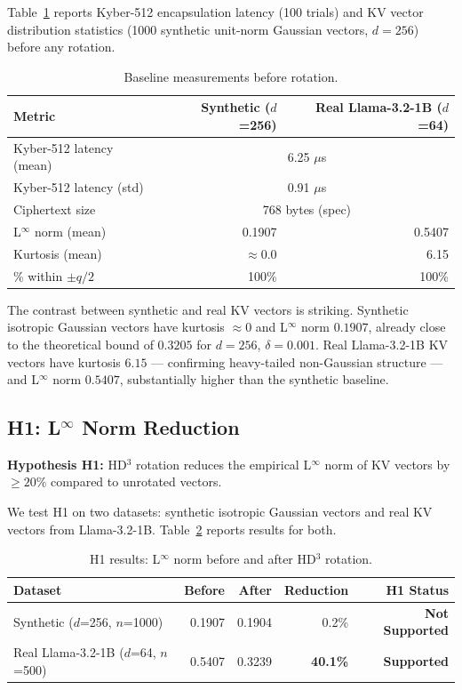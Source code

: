 \documentclass[preprint,a4paper]{article}
\begin{document}
Table~\ref{tab:baseline} reports Kyber-512
encapsulation latency (100 trials) and KV vector
distribution statistics (1000 synthetic unit-norm
Gaussian vectors, $d = 256$) before any rotation.

\begin{table}[h]
\centering
\caption{Baseline measurements before rotation.}
\label{tab:baseline}
\begin{tabular}{lrr}
\toprule
\textbf{Metric} & \textbf{Synthetic ($d$=256)}
& \textbf{Real Llama-3.2-1B ($d$=64)} \\
\midrule
Kyber-512 latency (mean) & \multicolumn{2}{c}{6.25 $\mu$s} \\
Kyber-512 latency (std)  & \multicolumn{2}{c}{0.91 $\mu$s} \\
Ciphertext size          & \multicolumn{2}{c}{768 bytes (spec)} \\
\midrule
L$^\infty$ norm (mean) & 0.1907 & 0.5407 \\
Kurtosis (mean)        & $\approx 0.0$ & 6.15 \\
\% within $\pm q/2$    & 100\% & 100\% \\
\bottomrule
\end{tabular}
\end{table}

The contrast between synthetic and real KV vectors
is striking. Synthetic isotropic Gaussian vectors
have kurtosis $\approx 0$ and L$^\infty$ norm
$0.1907$, already close to the theoretical bound
of $0.3205$ for $d = 256$, $\delta = 0.001$.
Real Llama-3.2-1B KV vectors have kurtosis $6.15$
--- confirming heavy-tailed non-Gaussian structure
--- and L$^\infty$ norm $0.5407$, substantially
higher than the synthetic baseline.

\subsection{H1: L$^\infty$ Norm Reduction}
\label{sec:h1}

\textbf{Hypothesis H1:} HD$^3$ rotation reduces the
empirical L$^\infty$ norm of KV vectors by $\geq 20\%$
compared to unrotated vectors.

We test H1 on two datasets: synthetic isotropic
Gaussian vectors and real KV vectors from
Llama-3.2-1B. Table~\ref{tab:h1} reports results
for both.

\begin{table}[h]
\centering
\caption{H1 results: L$^\infty$ norm before and
after HD$^3$ rotation.}
\label{tab:h1}
\begin{tabular}{lrrrr}
\toprule
\textbf{Dataset} & \textbf{Before} & \textbf{After}
& \textbf{Reduction} & \textbf{H1 Status} \\
\midrule
Synthetic ($d$=256, $n$=1000) &
0.1907 & 0.1904 & 0.2\% &
\textbf{Not Supported} \\
Real Llama-3.2-1B ($d$=64, $n$=500) &
0.5407 & 0.3239 & \textbf{40.1\%} &
\textbf{Supported} \\
\bottomrule
\end{tabular}
\end{table}
\end{document}
